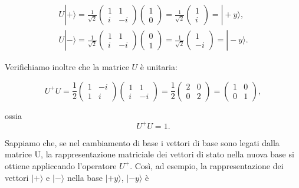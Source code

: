 \begin{equation}
\begin{array}{r}
U | + \rangle = \frac{1}{\sqrt{2}}
\begin{pmatrix}
1 & 1 \\
i & -i
\end{pmatrix}
\begin{pmatrix}
1\\
0
\end{pmatrix}=
\frac{1}{\sqrt{2}}
\begin{pmatrix}
1\\
i
\end{pmatrix}=
| +y \rangle , \\
U | - \rangle= \frac{1}{\sqrt{2}}
\begin{pmatrix}
1 & 1 \\
i & -i
\end{pmatrix}
\begin{pmatrix}
0\\
1
\end{pmatrix}=
\frac{1}{\sqrt{2}}
\begin{pmatrix}
1\\
-i
\end{pmatrix}=
| -y \rangle . 
\end{array}
\end{equation}

Verifichiamo inoltre che la matrice $U$ è unitaria:

\begin{equation}
U^+U = \frac{1}{2}
\begin{pmatrix}
1 & -i\\
1 & i
\end{pmatrix}
\begin{pmatrix}
1 & 1\\
i & -i
\end{pmatrix}=
\frac{1}{2}
\begin{pmatrix}
2 & 0\\
0 & 2
\end{pmatrix}=
\begin{pmatrix}
1 & 0\\
0 &1
\end{pmatrix} , 
\end{equation}

ossia
\begin{equation}
U^+U=1 . 
\end{equation}

Sappiamo che, se nel cambiamento di base i vettori di base sono legati dalla matrice U, la rappresentazione matriciale dei vettori di stato nella nuova base si ottiene appliccando l'operatore $U^+$. Così, ad esempio, la rappresentazione dei vettori $| + \rangle $ e $| - \rangle $ nella base  $| +y \rangle $, $| -y \rangle $ è

